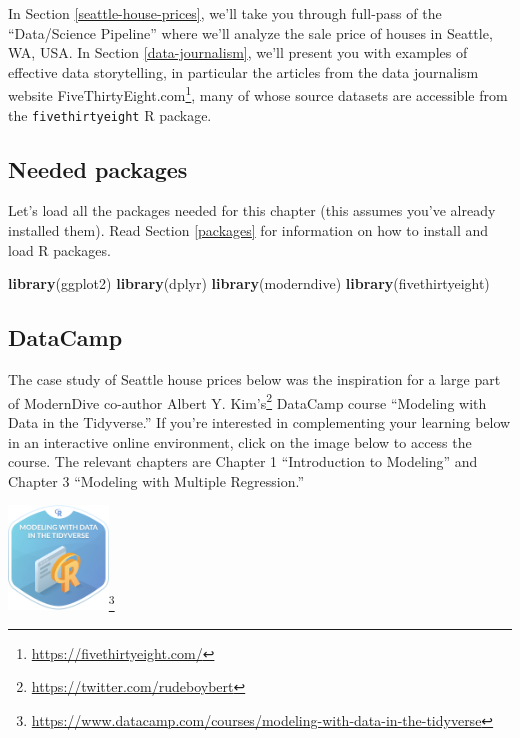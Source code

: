 \documentclass[12pt,]{krantz}
\makeatletter
\newenvironment{Shaded}{\begin{snugshade}}{\end{snugshade}}
\newcommand{\KeywordTok}[1]{\textcolor[rgb]{0.27,0.27,0.27}{\textbf{#1}}}
\newcommand{\NormalTok}[1]{#1}
\renewcommand{\href}[2]{#2\footnote{\url{#1}}}
\newenvironment{kframe}{%
\medskip{}
\setlength{\fboxsep}{.8em}
 \def\at@end@of@kframe{}%
 \ifinner\ifhmode%
  \def\at@end@of@kframe{\end{minipage}}%
  \begin{minipage}{\columnwidth}%
 \fi\fi%
 \def\FrameCommand##1{\hskip\@totalleftmargin \hskip-\fboxsep
 \colorbox{shadecolor}{##1}\hskip-\fboxsep
     \hskip-\linewidth \hskip-\@totalleftmargin \hskip\columnwidth}%
 \MakeFramed {\advance\hsize-\width
   \@totalleftmargin\z@ \linewidth\hsize
   \@setminipage}}%
 {\par\unskip\endMakeFramed%
 \at@end@of@kframe}
\renewenvironment{Shaded}{\begin{kframe}}{\end{kframe}}
\theoremstyle{definition}
\theoremstyle{definition}
\theoremstyle{definition}
\theoremstyle{remark}
\makeatother
\begin{document}
In Section \ref{seattle-house-prices}, we'll take you through full-pass
of the ``Data/Science Pipeline'' where we'll analyze the sale price of
houses in Seattle, WA, USA. In Section \ref{data-journalism}, we'll
present you with examples of effective data storytelling, in particular
the articles from the data journalism website
\href{https://fivethirtyeight.com/}{FiveThirtyEight.com}, many of whose
source datasets are accessible from the \texttt{fivethirtyeight} R
package.

\subsection*{Needed packages}\label{needed-packages-9}


Let's load all the packages needed for this chapter (this assumes you've
already installed them). Read Section \ref{packages} for information on
how to install and load R packages.

\begin{Shaded}
\begin{Highlighting}[]
\KeywordTok{library}\NormalTok{(ggplot2)}
\KeywordTok{library}\NormalTok{(dplyr)}
\KeywordTok{library}\NormalTok{(moderndive)}
\KeywordTok{library}\NormalTok{(fivethirtyeight)}
\end{Highlighting}
\end{Shaded}

\subsection*{DataCamp}\label{datacamp-8}


The case study of Seattle house prices below was the inspiration for a
large part of ModernDive co-author
\href{https://twitter.com/rudeboybert}{Albert Y. Kim's} DataCamp course
``Modeling with Data in the Tidyverse.'' If you're interested in
complementing your learning below in an interactive online environment,
click on the image below to access the course. The relevant chapters are
Chapter 1 ``Introduction to Modeling'' and Chapter 3 ``Modeling with
Multiple Regression.''

\begin{center}
\href{https://www.datacamp.com/courses/modeling-with-data-in-the-tidyverse}{\includegraphics[width=0.2\textwidth]{images/datacamp_intro_to_modeling.png}}
\end{center}
\end{document}
